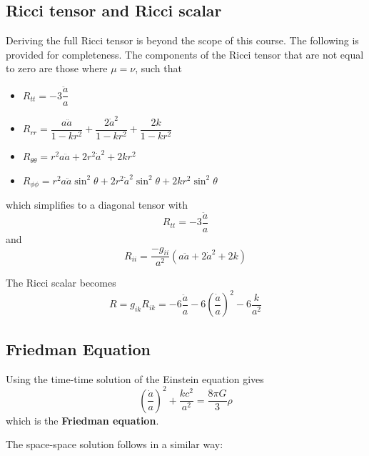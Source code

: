 \documentclass[11pt,a4paper,notoc]{tufte-handout}
\begin{document}
\hypertarget{sec:ricci}{%
\subsection{Ricci tensor and Ricci scalar}\label{sec:ricci}}

Deriving the full Ricci tensor is beyond the scope of this course. The
following is provided for completeness. The components of the Ricci
tensor that are not equal to zero are those where \(\mu = \nu\), such that

\begin{itemize}
\item
  \(R_{tt} = -3\dfrac{\ddot{a}}{a}\)
\item
  \(R_{rr} = \dfrac{a\ddot{a}}{1 - kr^2} + \dfrac{2\dot{a}^2}{1 - kr^2} + \dfrac{2k}{1-kr^2}\)
\item
  \(R_{\theta\theta} = r^2a\ddot{a} + 2r^2\dot{a}^2 + 2kr^2\)
\item
  \(R_{\phi\phi} = r^2 a\ddot{a}\sin^2\theta + 2r^2\dot{a}^2\sin^2\theta + 2kr^2 \sin^2\theta\)
\end{itemize}

which simplifies to a diagonal tensor with
\begin{equation}
R_{tt}= -3\dfrac{\ddot{a}}{a}
\label{eq:ric-tt}
\end{equation}
and
\begin{equation}
R_{ii} = \dfrac{-g_{ii}}{a^2}\left(a\ddot{a} + 2\dot{a}^2 + 2k\right)
\label{eq:ric-ii}
\end{equation}

The Ricci scalar becomes
\begin{equation}
R = g_{ik}R_{ik} = - 6\dfrac{\ddot{a}}{a} - 6\left(\dfrac{\dot{a}}{a}\right)^2 - 6\dfrac{k}{a^2}
\label{eq:ric-scal}
\end{equation}

\hypertarget{sec:friedman}{%
\subsection{Friedman Equation}\label{sec:friedman}}

Using the time-time solution of the Einstein equation gives
\begin{equation}
    \left(\dfrac{\dot{a}}{a}\right)^2 + \dfrac{kc^2}{a^2} = \dfrac{8\pi G}{3}\rho
\label{eq:friedman}
\end{equation}
which is the \textbf{Friedman equation}.

The space-space solution follows in a similar way:
\end{document}
